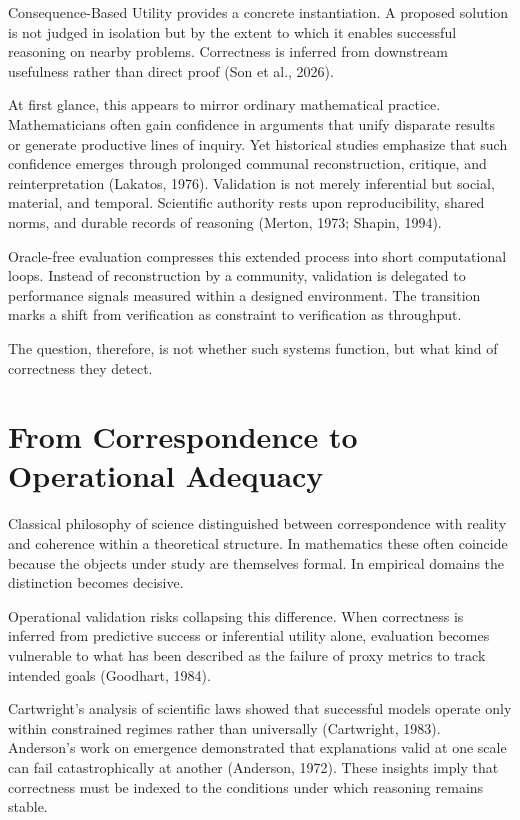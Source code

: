 \documentclass[12pt]{article}
\begin{document}
Consequence-Based Utility provides a concrete instantiation. A proposed solution is not judged in isolation but by the extent to which it enables successful reasoning on nearby problems. Correctness is inferred from downstream usefulness rather than direct proof (Son et al., 2026).

At first glance, this appears to mirror ordinary mathematical practice. Mathematicians often gain confidence in arguments that unify disparate results or generate productive lines of inquiry. Yet historical studies emphasize that such confidence emerges through prolonged communal reconstruction, critique, and reinterpretation (Lakatos, 1976). Validation is not merely inferential but social, material, and temporal. Scientific authority rests upon reproducibility, shared norms, and durable records of reasoning (Merton, 1973; Shapin, 1994).

Oracle-free evaluation compresses this extended process into short computational loops. Instead of reconstruction by a community, validation is delegated to performance signals measured within a designed environment. The transition marks a shift from verification as constraint to verification as throughput.

The question, therefore, is not whether such systems function, but what kind of correctness they detect.

\section{From Correspondence to Operational Adequacy}

Classical philosophy of science distinguished between correspondence with reality and coherence within a theoretical structure. In mathematics these often coincide because the objects under study are themselves formal. In empirical domains the distinction becomes decisive.

Operational validation risks collapsing this difference. When correctness is inferred from predictive success or inferential utility alone, evaluation becomes vulnerable to what has been described as the failure of proxy metrics to track intended goals (Goodhart, 1984).

Cartwright's analysis of scientific laws showed that successful models operate only within constrained regimes rather than universally (Cartwright, 1983). Anderson's work on emergence demonstrated that explanations valid at one scale can fail catastrophically at another (Anderson, 1972). These insights imply that correctness must be indexed to the conditions under which reasoning remains stable.
\end{document}
